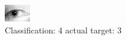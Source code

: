 \begin{figure}[h!]
\begin{center}
\includegraphics[width=0.60\columnwidth]{figures/ID1287_class_4_target_3.png}
\end{center}
\caption{ Classification: 4 actual target: 3}
\label{fig:ID1287_class_4_target_3}
\end{figure}
